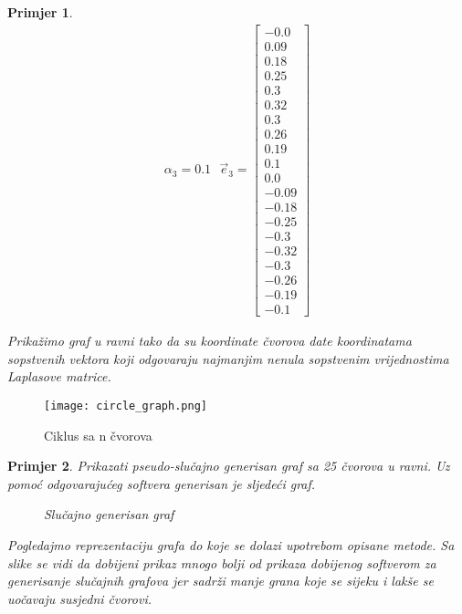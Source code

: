 \documentclass[11pt]{article}
\newtheorem{example}{Primjer}
\begin{document}
\begin{example}
\[\begin{split}
				\alpha_3=0.1  \text{  } \vec{e}_3 = \begin{bmatrix} -0.0 \\ 0.09 \\ 0.18 \\ 0.25 \\ 0.3 \\ 0.32 \\ 0.3 \\ 0.26 \\ 0.19 \\ 0.1 \\ 0.0 \\ -0.09 \\ -0.18 \\ -0.25 \\ -0.3 \\ -0.32 \\ -0.3 \\ -0.26 \\ -0.19 \\ -0.1 \end{bmatrix}
			\end{split}
		\]
			
		Prikažimo graf u ravni tako da su koordinate čvorova date koordinatama sopstvenih vektora koji odgovaraju najmanjim nenula sopstvenim vrijednostima Laplasove matrice.
			
		\end{example}
		
		\begin{figure}[h]
			\centering
			\texttt{[image: circle\_graph.png]}
			\caption{Ciklus sa n čvorova}
		\end{figure}

		\newpage

		\begin{example}
			Prikazati pseudo-slučajno generisan graf sa 25 čvorova u ravni.
			Uz pomoć odgovarajućeg softvera generisan je sljedeći graf.
			\begin{figure}[h]
				\centering
				\hfill
				\caption{Slučajno generisan  graf}
			\end{figure}
			
			Pogledajmo reprezentaciju grafa do koje se dolazi upotrebom opisane metode. 
			Sa slike se vidi da dobijeni prikaz mnogo bolji od prikaza dobijenog softverom za generisanje slučajnih grafova jer sadrži manje grana koje se sijeku i lakše se uočavaju susjedni čvorovi.
		\end{example}
            
\end{document}
